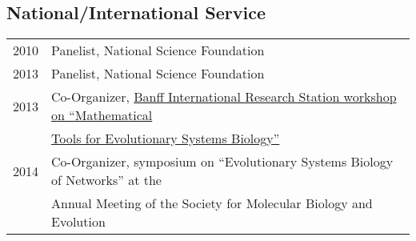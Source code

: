 \documentclass[11pt]{article}
\begin{document}
\subsection*{National/International Service}
\begin{longtable}[l]{l l}
2010 & Panelist, National Science Foundation\\%
2013 & Panelist, National Science Foundation\\%
2013 & Co-Organizer, \href{http://www.birs.ca/events/2013/5-day-workshops/13w5080}{Banff International Research Station workshop on ``Mathematical}\\
&\href{http://www.birs.ca/events/2013/5-day-workshops/13w5080}{Tools for Evolutionary Systems Biology''}\\
2014 & Co-Organizer, symposium on ``Evolutionary Systems Biology of Networks'' at the\\
&Annual Meeting of the Society for Molecular Biology and Evolution\\

\end{longtable}
\end{document}
